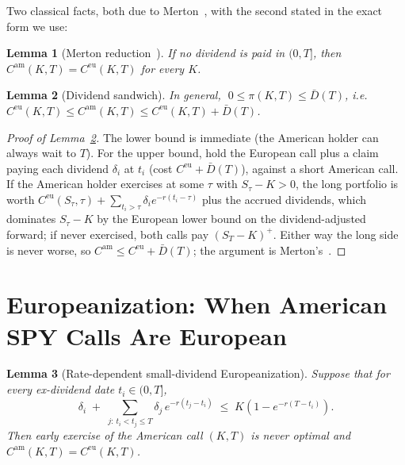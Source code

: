 \documentclass[11pt]{article}
\newtheorem{lemma}{Lemma}
\theoremstyle{remark}
\newcommand{\Cam}{C^{\mathrm{am}}}
\newcommand{\Ceu}{C^{\mathrm{eu}}}
\begin{document}
Two classical facts, both due to Merton~\cite{merton}, with the second stated in the exact form we use:
\begin{lemma}[Merton reduction~\cite{merton}]\label{lem:merton}
If no dividend is paid in $(0,T]$, then $\Cam(K,T)=\Ceu(K,T)$ for every $K$.
\end{lemma}
\begin{lemma}[Dividend sandwich]\label{lem:sandwich}
In general, $\;0\le \pi(K,T)\le \bar D(T)$, i.e.\ $\Ceu(K,T)\le\Cam(K,T)\le \Ceu(K,T)+\bar D(T)$.
\end{lemma}
\begin{proof}[Proof of Lemma~\ref{lem:sandwich}]
The lower bound is immediate (the American holder can always wait to $T$). For the upper bound, hold the European call plus a claim paying each dividend $\delta_i$ at $t_i$ (cost $\Ceu+\bar D(T)$), against a short American call. If the American holder exercises at some $\tau$ with $S_\tau-K>0$, the long portfolio is worth $\Ceu(S_\tau,\tau)+\sum_{t_i>\tau}\delta_i e^{-r(t_i-\tau)}$ plus the accrued dividends, which dominates $S_\tau-K$ by the European lower bound on the dividend-adjusted forward; if never exercised, both calls pay $(S_T-K)^+$. Either way the long side is never worse, so $\Cam\le\Ceu+\bar D(T)$; the argument is Merton's~\cite{merton}.
\end{proof}

\section{Europeanization: When American SPY Calls Are European}

\begin{lemma}[Rate-dependent small-dividend Europeanization]\label{lem:smalldiv}
Suppose that for every ex-dividend date $t_i\in(0,T]$,
\begin{equation}
\delta_i\;+\;\sum_{j:\,t_i<t_j\le T}\delta_j\,e^{-r(t_j-t_i)}\;\le\;K\left(1-e^{-r(T-t_i)}\right).
\label{eq:smalldiv}
\end{equation}
Then early exercise of the American call $(K,T)$ is never optimal and $\Cam(K,T)=\Ceu(K,T)$.
\end{lemma}
\end{document}
